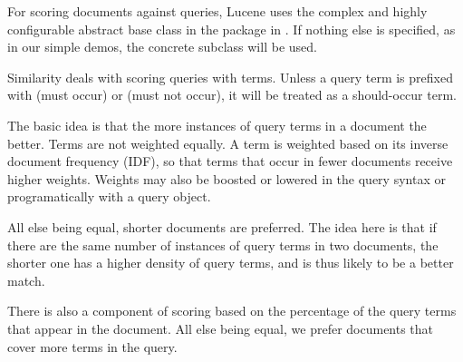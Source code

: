 For scoring documents against queries, Lucene uses the complex and
highly configurable abstract base class  in the
package in .  If nothing else is
specified, as in our simple demos, the concrete subclass
 will be used.

Similarity deals with scoring queries with  terms.
Unless a query term is prefixed with \code{+} (must occur) or \code{-}
(must not occur), it will be treated as a should-occur term.

The basic idea is that the more instances of query terms in a document
the better.  Terms are not weighted equally.  A term is weighted based
on its inverse document frequency (IDF), so that terms that occur in
fewer documents receive higher weights.  Weights may also be boosted
or lowered in the query syntax or programatically with a query object.

All else being equal, shorter documents are preferred.  The idea here
is that if there are the same number of instances of query terms in two
documents, the shorter one has a higher density of query terms, and is
thus likely to be a better match.  

There is also a component of scoring based on the percentage of the
query terms that appear in the document.  All else being equal, we
prefer documents that cover more terms in the query.





 







